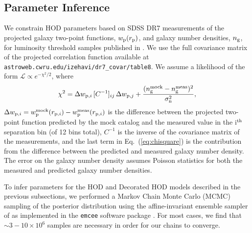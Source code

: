 \documentclass[usenatbib,usegraphicx,letterpaper]{mn2e}
\begin{document}
\subsection{Parameter Inference}
\label{subsection:mcmc}

We constrain HOD parameters based on SDSS DR7 measurements of the projected
galaxy two-point functions, $w_{\rm p}(r_{\rm p})$, and galaxy number densities, $n_{\rm g}$,
for luminosity threshold samples published in \citet{zehavi_etal11}. We use the full covariance
matrix of the projected correlation function available at
{\tt astroweb.cwru.edu/izehavi/dr7\_covar/table8}. We assume a likelihood of the
form $\mathcal{L} \propto e^{-\chi^2/2}$, where
%
\begin{equation}
\label{eq:chisquare}
\chi^2 = \Delta w_{{\rm p},i} \, [C^{-1}]_{ij} \, \Delta w_{{\rm p},j} + \frac{(n_{\rm g}^{\rm mock} - n_{\rm g}^{\rm meas})^2}{\sigma_{\rm n}^2},
\end{equation}
%
$\Delta w_{{\rm p},i} = w_{\rm p}^{\rm mock}(r_{{\rm p},i}) - w_{\rm p}^{\rm meas}(r_{{\rm p},i})$ is the difference
between the projected two-point function predicted by the mock catalog and the measured value in the i$^{\rm th}$
separation bin (of 12 bins total), $C^{-1}$ is the inverse of the covariance matrix of the measurements,
and the last term in Eq.~(\ref{eq:chisquare}) is the contribution from the difference between the predicted and measured
galaxy number density. The error on the galaxy number density assumes Poisson statistics for both the measured and predicted
galaxy number densities.


To infer parameters for the HOD and Decorated HOD models described in the previous subsections,
we performed a Markov Chain Monte Carlo (MCMC) sampling of the posterior distribution using the
affine-invariant ensemble sampler of \citet{goodman_weare10} as implemented in the
{\tt emcee} software package \citep{foreman-mackey_etal13}. For most cases, we find that
$\sim 3-10 \times 10^{6}$ samples are necessary in order for our chains to converge.
\end{document}
